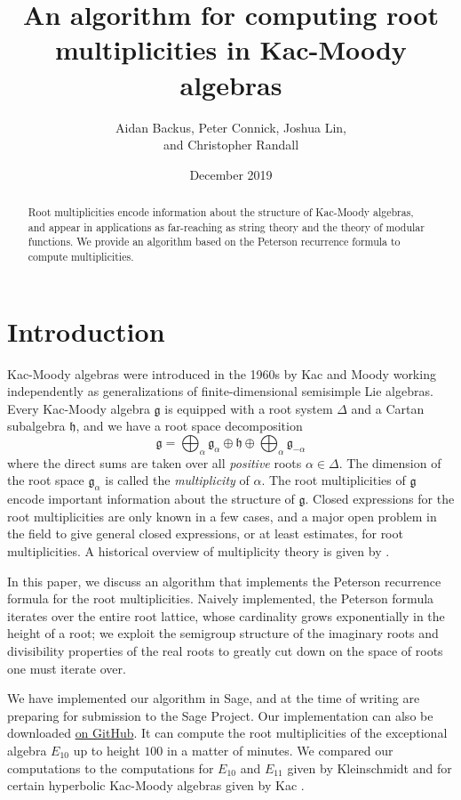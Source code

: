 \documentclass[12pt]{article}
\title{An algorithm for computing root multiplicities in Kac-Moody algebras}
\author{Aidan Backus, Peter Connick, Joshua Lin,\\and Christopher Randall}
\date{December 2019}
\newcommand{\g}{\mathfrak g}
\newcommand{\h}{\mathfrak h}
\newcommand{\dfn}[1]{\emph{#1}\index{#1}}
\theoremstyle{definition}
\begin{document}
\maketitle

\begin{abstract}
    Root multiplicities encode information about the structure of Kac-Moody algebras, and appear in applications as far-reaching as string theory and the theory of modular functions. We provide an algorithm based on the Peterson recurrence formula to compute multiplicities. 
\end{abstract}

\section{Introduction}
Kac-Moody algebras were introduced in the 1960s by Kac and Moody working independently as generalizations of finite-dimensional semisimple Lie algebras. Every Kac-Moody algebra $\g$ is equipped with a root system $\Delta$ and a Cartan subalgebra $\h$, and we have a root space decomposition
$$\g = \bigoplus_\alpha \g_\alpha \oplus \h \oplus \bigoplus_\alpha \g_{-\alpha}$$
where the direct sums are taken over all \emph{positive} roots $\alpha \in \Delta$. The dimension of the root space $\g_\alpha$ is called the \dfn{multiplicity} of $\alpha$. The root multiplicities of $\g$ encode important information about the structure of $\g$. Closed expressions for the root multiplicities are only known in a few cases, and a major open problem in the field to give general closed expressions, or at least estimates, for root multiplicities. A historical overview of multiplicity theory is given by  \cite[\S1]{carbone2014dimensions}.

In this paper, we discuss an algorithm that implements the Peterson recurrence formula for the root multiplicities. Naively implemented, the Peterson formula iterates over the entire root lattice, whose cardinality grows exponentially in the height of a root; we exploit the semigroup structure of the imaginary roots and divisibility properties of the real roots to greatly cut down on the space of roots one must iterate over.

We have implemented our algorithm in Sage, and at the time of writing are preparing for submission to the Sage Project. Our implementation can also be downloaded \href{https://github.com/catuse/kacmoody/blob/master/kac_moody_algebra.sage}{on GitHub}. It can compute the root multiplicities of the exceptional algebra $E_{10}$ up to height $100$ in a matter of minutes. We compared our computations to the computations for $E_{10}$ and $E_{11}$ given by Kleinschmidt \cite{kleinschmidt2004e11} and for certain hyperbolic Kac-Moody algebras given by Kac \cite[\S11.15]{kac_2014}.
\end{document}
